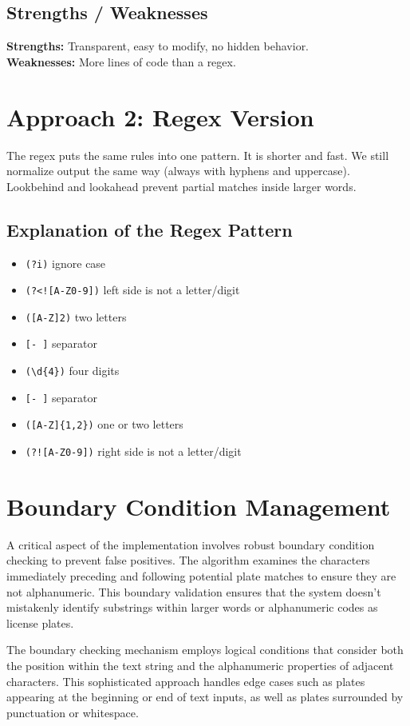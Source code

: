 \documentclass[12pt,a4paper]{article}
\begin{document}
\subsection{Strengths / Weaknesses}
\textbf{Strengths:} Transparent, easy to modify, no hidden behavior. \\
\textbf{Weaknesses:} More lines of code than a regex.

\section{Approach 2: Regex Version}
The regex puts the same rules into one pattern. It is shorter and fast. We still normalize output the same way (always with hyphens and uppercase). Lookbehind and lookahead prevent partial matches inside larger words.

\subsection{Explanation of the Regex Pattern}
\begin{itemize}
    \item \texttt{(?i)} ignore case
    \item \texttt{(?<![A-Z0-9])} left side is not a letter/digit
    \item \texttt{([A-Z]{2})} two letters
    \item \texttt{[- ]} separator
    \item \texttt{(\textbackslash d\{4\})} four digits
    \item \texttt{[- ]} separator
    \item \texttt{([A-Z]\{1,2\})} one or two letters
    \item \texttt{(?![A-Z0-9])} right side is not a letter/digit
\end{itemize}

\section{Boundary Condition Management}

A critical aspect of the implementation involves robust boundary condition checking to prevent false positives. The algorithm examines the characters immediately preceding and following potential plate matches to ensure they are not alphanumeric. This boundary validation ensures that the system doesn't mistakenly identify substrings within larger words or alphanumeric codes as license plates.

The boundary checking mechanism employs logical conditions that consider both the position within the text string and the alphanumeric properties of adjacent characters. This sophisticated approach handles edge cases such as plates appearing at the beginning or end of text inputs, as well as plates surrounded by punctuation or whitespace.
\end{document}
